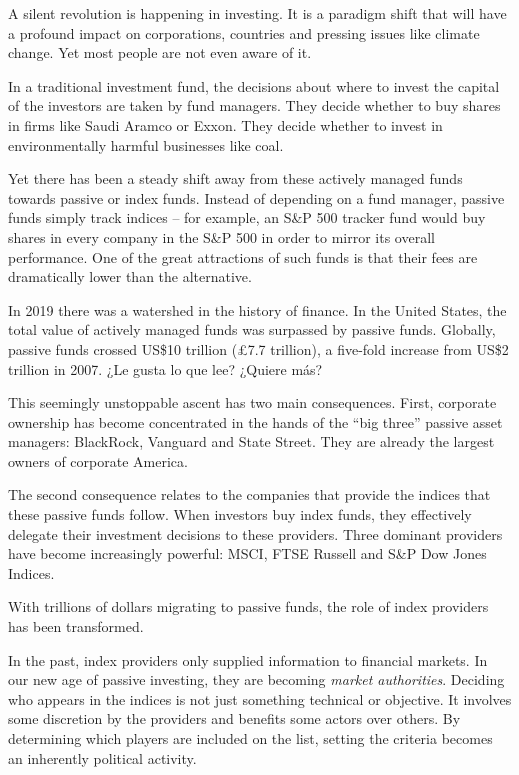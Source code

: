 \documentclass[
]{book}
\begin{document}
A silent revolution is happening in investing. It is a paradigm shift that will have a profound impact on corporations, countries and pressing issues like climate change. Yet most people are not even aware of it.

In a traditional investment fund, the decisions about where to invest the capital of the investors are taken by fund managers. They decide whether to buy shares in firms like Saudi Aramco or Exxon. They decide whether to invest in environmentally harmful businesses like coal.

Yet there has been a steady shift away from these actively managed funds towards passive or index funds. Instead of depending on a fund manager, passive funds simply track indices -- for example, an S\&P 500 tracker fund would buy shares in every company in the S\&P 500 in order to mirror its overall performance. One of the great attractions of such funds is that their fees are dramatically lower than the alternative.

In 2019 there was a watershed in the history of finance. In the United States, the total value of actively managed funds was surpassed by passive funds. Globally, passive funds crossed US\$10 trillion (£7.7 trillion), a five-fold increase from US\$2 trillion in 2007.
¿Le gusta lo que lee? ¿Quiere más?

This seemingly unstoppable ascent has two main consequences. First, corporate ownership has become concentrated in the hands of the ``big three'' passive asset managers: BlackRock, Vanguard and State Street. They are already the largest owners of corporate America.

The second consequence relates to the companies that provide the indices that these passive funds follow. When investors buy index funds, they effectively delegate their investment decisions to these providers. Three dominant providers have become increasingly powerful: MSCI, FTSE Russell and S\&P Dow Jones Indices.

With trillions of dollars migrating to passive funds, the role of index providers has been transformed.

In the past, index providers only supplied information to financial markets. In our new age of passive investing, they are becoming \emph{market authorities}.
Deciding who appears in the indices is not just something technical or objective. It involves some discretion by the providers and benefits some actors over others. By determining which players are included on the list, setting the criteria becomes an inherently political activity.
\end{document}

